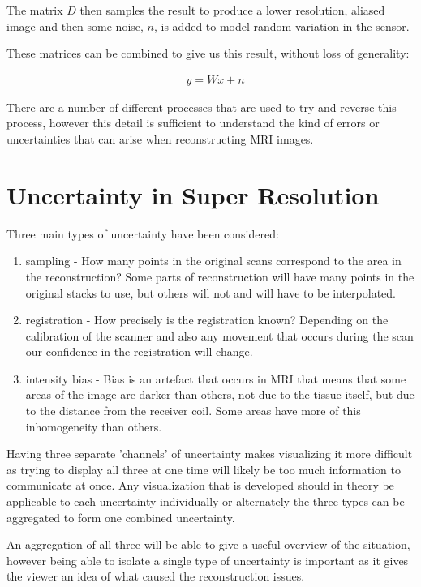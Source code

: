 The matrix $D$ then samples the result to produce a lower resolution, aliased image and then some noise, $n$, is added to model random variation in the sensor.

These matrices can be combined to give us this result, without loss of generality:

\begin{align}
& y = Wx + n \nonumber
\end{align}

There are a number of different processes that are used to try and reverse this process, however this detail is sufficient to understand the kind of errors or uncertainties that can arise when reconstructing MRI images.

\newpage
\section{Uncertainty in Super Resolution}
Three main types of uncertainty have been considered:

\begin{enumerate}
	\item sampling - How many points in the original scans correspond to the area in the reconstruction? Some parts of reconstruction will have many points in the original stacks to use, but others will not and will have to be interpolated.
	\item registration - How precisely is the registration known? Depending on the calibration of the scanner and also any movement that occurs during the scan our confidence in the registration will change.
	\item intensity bias - Bias is an artefact that occurs in MRI that means that some areas of the image are darker than others, not due to the tissue itself, but due to the distance from the receiver coil. Some areas have more of this inhomogeneity than others.
\end{enumerate}

Having three separate 'channels' of uncertainty makes visualizing it more difficult as trying to display all three at one time will likely be too much information to communicate at once. Any visualization that is developed should in theory be applicable to each uncertainty individually or alternately the three types can be aggregated to form one combined uncertainty.

An aggregation of all three will be able to give a useful overview of the situation, however being able to isolate a single type of uncertainty is important as it gives the viewer an idea of what caused the reconstruction issues.

